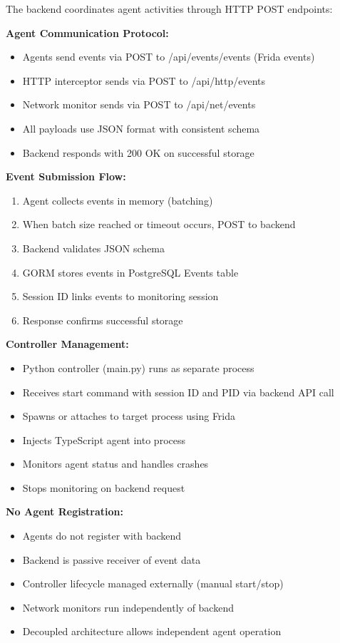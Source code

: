 The backend coordinates agent activities through HTTP POST endpoints:

\textbf{Agent Communication Protocol:}
\begin{itemize}
    \item Agents send events via POST to /api/events/events (Frida events)
    \item HTTP interceptor sends via POST to /api/http/events
    \item Network monitor sends via POST to /api/net/events
    \item All payloads use JSON format with consistent schema
    \item Backend responds with 200 OK on successful storage
\end{itemize}

\textbf{Event Submission Flow:}
\begin{enumerate}
    \item Agent collects events in memory (batching)
    \item When batch size reached or timeout occurs, POST to backend
    \item Backend validates JSON schema
    \item GORM stores events in PostgreSQL Events table
    \item Session ID links events to monitoring session
    \item Response confirms successful storage
\end{enumerate}

\textbf{Controller Management:}
\begin{itemize}
    \item Python controller (main.py) runs as separate process
    \item Receives start command with session ID and PID via backend API call
    \item Spawns or attaches to target process using Frida
    \item Injects TypeScript agent into process
    \item Monitors agent status and handles crashes
    \item Stops monitoring on backend request
\end{itemize}

\textbf{No Agent Registration:}
\begin{itemize}
    \item Agents do not register with backend
    \item Backend is passive receiver of event data
    \item Controller lifecycle managed externally (manual start/stop)
    \item Network monitors run independently of backend
    \item Decoupled architecture allows independent agent operation
\end{itemize}

